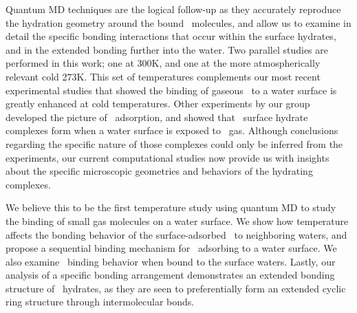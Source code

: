 
Quantum MD techniques are the logical follow-up as they accurately reproduce the hydration geometry around the bound \suldiox~molecules, and allow us to examine in detail the specific bonding interactions that occur within the surface hydrates, and in the extended bonding further into the water.\cite{Baer2010} Two parallel studies are performed in this work; one at 300K, and one at the more atmospherically relevant cold 273K. This set of temperatures complements our most recent experimental studies that showed the binding of gaseous \suldiox~to a water surface is greatly enhanced at cold temperatures.\cite{Ota2011} Other experiments by our group developed the picture of \suldiox~adsorption, and showed that \suldiox~surface hydrate complexes form when a water surface is exposed to \suldiox~gas.\cite{Tarbuck2005,Tarbuck2006} Although conclusions regarding the specific nature of those complexes could only be inferred from the experiments, our current computational studies now provide us with insights about the specific microscopic geometries and behaviors of the hydrating complexes.

We believe this to be the first temperature study using quantum MD to study the binding of small gas molecules on a water surface. We show how temperature affects the bonding behavior of the surface-adsorbed \suldiox~to neighboring waters, and propose a sequential binding mechanism for \suldiox~adsorbing to a water surface. We also examine \suldiox~binding behavior when bound to the surface waters. Lastly, our analysis of a specific bonding arrangement demonstrates an extended bonding structure of \suldiox~hydrates, as they are seen to preferentially form an extended cyclic ring structure through intermolecular bonds.
